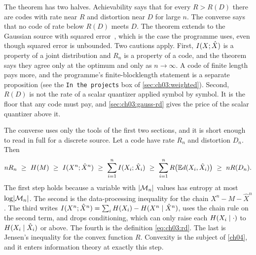 The theorem has two halves. Achievability says that for every $R>R(D)$ there are codes with rate near $R$ and distortion near $D$ for large $n$. The converse says that no code of rate below $R(D)$ meets $D$. The theorem extends to the Gaussian source with squared error~\cite{berger1971}, which is the case the programme uses, even though squared error is unbounded. Two cautions apply. First, $I(X;\hat X)$ is a property of a joint distribution and $R_n$ is a property of a code, and the theorem says they agree only at the optimum and only as $n\to\infty$. A code of finite length pays more, and the programme's finite-blocklength statement is a separate proposition (see the \texttt{In the projects} box of \cref{sec:ch03:weighted}). Second, $R(D)$ is not the rate of a scalar quantizer applied symbol by symbol. It is the floor that any code must pay, and \cref{sec:ch03:gauss-rd} gives the price of the scalar quantizer above it.

The converse uses only the tools of the first two sections, and it is short enough to read in full for a discrete source. Let a code have rate $R_n$ and distortion $D_n$. Then
\begin{equation}\label{eq:ch03:converse}
nR_n\ \ge\ \Ent(M)\ \ge\ \MI{X^n}{\hat X^n}\ \ge\ \sum_{i=1}^n\MI{X_i}{\hat X_i}\ \ge\ \sum_{i=1}^n R\bigl(\E d(X_i,\hat X_i)\bigr)\ \ge\ nR(D_n).
\end{equation}
The first step holds because a variable with $\lvert \mathcal M_n\rvert$ values has entropy at most $\log\lvert \mathcal M_n\rvert$. The second is the data-processing inequality for the chain $X^n-M-\hat X^n$. The third writes $I(X^n;\hat X^n)=\sum_iH(X_i)-H(X^n\mid\hat X^n)$, uses the chain rule on the second term, and drops conditioning, which can only raise each $H(X_i\mid\cdot)$ to $H(X_i\mid\hat X_i)$ or above. The fourth is the definition \eqref{eq:ch03:rd}. The last is Jensen's inequality for the convex function $R$. Convexity is the subject of \cref{ch04}, and it enters information theory at exactly this step.


